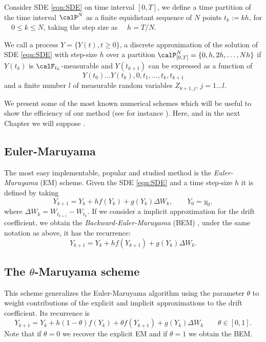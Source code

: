 	Consider SDE \eqref{eqn:SDE} on time interval $[0,T]$, we define a time
partition of the time interval $\calP^{N}$ as a finite equidistant sequence of $N$ points 
$t_k:=kh$, for $\quad 0\leq k\leq N$, taking the step size as $\quad h =T/N$.
\begin{definition}\label{dfn:ATD}
	We call a process $Y=\{Y(t),t\geq 0 \}$, a discrete approximation of the solution of SDE
	\eqref{eqn:SDE} with step-size $h$ over a partition 
	$\calP_{[0,T]}^N =\{0, h, 2h, \ldots, N h\} $ if $Y(t_k)$ is $\calF_{t_{k}}$-measurable and
	$Y(t_{k+1})$ can be expressed as a function of 
	$$Y(t_0)\ldots Y(t_k), 0,t_1, \ldots, t_k, t_{k+1}$$
	and a finite number $l$ of measurable random variables $Z_{k+1,j}$, $j=1\ldots l$.
\end{definition}
%
	We present some of the most known numerical  schemes which will be useful 
to show the efficiency of our method (see for instance \cite{Kloeden1992,Milstein2004}). Here, and in the next Chapter 
we will suppose 
.
\subsection*{Euler-Maruyama}
	The most easy implementable, popular and studied method is the \emph{Euler-Maruyama} (EM) scheme. Given the SDE 
	\eqref{eqn:SDE} and a 
	time step-size $h$ it is defined by taking  
	\begin{equation}\label{eqn:EulerMaruyama}
		Y_{k+1}= Y_k + h f(Y_k) + g(Y_k)\Delta W_k, \qquad Y_0=y_0,
	\end{equation}
	where $\Delta W_k =W_{t_{k+1}}-W_{t_k}$. 
	If we consider a implicit approximation for the drift coefficient, we obtain  the \emph{Backward-Euler-Maruyama}
	(BEM) \cite{Mao2013}, under the same notation as above, it has the recurrence:
	\begin{equation}\label{eqn:BackwardEM}
		Y_{k+1} = Y_k + h f(Y_{k+1}) + g(Y_k)\Delta W_k.
	\end{equation}
\subsection*{The $\theta$-Maruyama scheme}
		This scheme generalizes the Euler-Maruyama algorithm using the parameter $\theta$ 
	to weight contributions of the explicit and implicit approximations to the drift coefficient.  Its  recurrence 
	is  
	\begin{equation}\label{eqn:ThetaEM}
		Y_{k+1} = Y_k + h(1-\theta)f(Y_{k}) + 
		\theta f(Y_{k+1}) +
		g(Y_k)\Delta W_k \qquad \theta \in [0,1].
	\end{equation}
	Note that if $\theta = 0$ we recover the explicit EM and if $\theta = 1$ we obtain the BEM.
